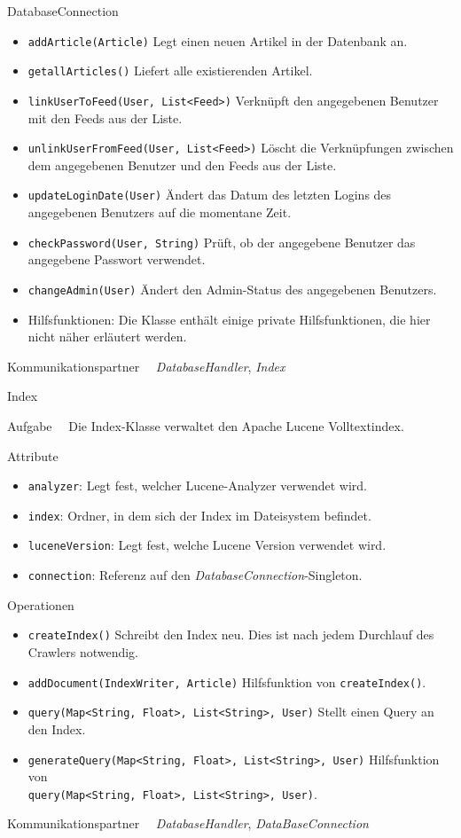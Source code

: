 \begin{class}{20}{DatabaseConnection}
\begin{itemize}
    \item \texttt{addArticle(Article)} Legt einen neuen Artikel in der Datenbank an.
    \item \texttt{getallArticles()} Liefert alle existierenden Artikel.
    \item \texttt{linkUserToFeed(User, List<Feed>)} Verknüpft den angegebenen Benutzer mit den Feeds aus der Liste.
    \item \texttt{unlinkUserFromFeed(User, List<Feed>)} Löscht die Verknüpfungen zwischen dem angegebenen Benutzer und den Feeds aus der Liste.
    \item \texttt{updateLoginDate(User)} Ändert das Datum des letzten Logins des angegebenen Benutzers auf die momentane Zeit.
    \item \texttt{checkPassword(User, String)} Prüft, ob der angegebene Benutzer das angegebene Passwort verwendet.
    \item \texttt{changeAdmin(User)} Ändert den Admin-Status des angegebenen Benutzers.
    \item Hilfsfunktionen: Die Klasse enthält einige private Hilfsfunktionen, die hier nicht näher erläutert werden.
\end{itemize}
\item[Kommunikationspartner]~\
\textit{DatabaseHandler}, \textit{Index}
\end{class}

\begin{class}{30}{Index}
\item[Aufgabe]~\
Die Index-Klasse verwaltet den Apache Lucene Volltextindex.
\item[Attribute]~\
\begin{itemize}
  \item \texttt{analyzer}: Legt fest, welcher Lucene-Analyzer verwendet wird.
  \item \texttt{index}: Ordner, in dem sich der Index im Dateisystem befindet.
  \item \texttt{luceneVersion}: Legt fest, welche Lucene Version verwendet wird.
  \item \texttt{connection}: Referenz auf den \textit{DatabaseConnection}-Singleton.
\end{itemize}
\item[Operationen]~\
\begin{itemize}
    \item \texttt{createIndex()}  Schreibt den Index neu. Dies ist nach jedem Durchlauf des Crawlers notwendig.
    \item \texttt{addDocument(IndexWriter, Article)} Hilfsfunktion von \texttt{createIndex()}.
    \item \texttt{query(Map<String, Float>, List<String>, User)} Stellt einen Query an den Index.
    \item \texttt{generateQuery(Map<String, Float>, List<String>, User)} Hilfsfunktion von\\ \texttt{query(Map<String, Float>, List<String>, User)}.
\end{itemize}
\item[Kommunikationspartner]~\
\textit{DatabaseHandler}, \textit{DataBaseConnection}
\end{class}

